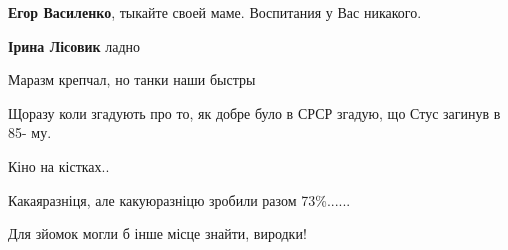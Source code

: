 \begin{itemize}
\begin{itemize}
\textbf{Егор Василенко}, тыкайте своей маме. Воспитания у Вас никакого.

 
\textbf{Ірина Лісовик} ладно
\end{itemize}

 
Маразм крепчал, но танки наши быстры

 
Щоразу коли згадують про то, як добре було в СРСР згадую, що Стус загинув в 85- му.

 
Кіно на кістках..

 
Какаяразніця, але какуюразніцю зробили разом 73\%......

 
Для зйомок могли б інше місце знайти, виродки!

 

\end{itemize}
